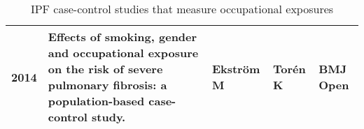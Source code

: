 \begin{table}
\begin{tabular}{lp{5cm}lll}
          2014    &  Effects of smoking, gender and occupational exposure on the risk of severe             pulmonary fibrosis: a population-based case-control study. & Ekström M &     Torén K &   BMJ Open        \\
          \bottomrule
       \end{tabular}
       \caption{IPF case-control studies that measure occupational exposures}
       \label{table:seedpapers}
  \end{table}

